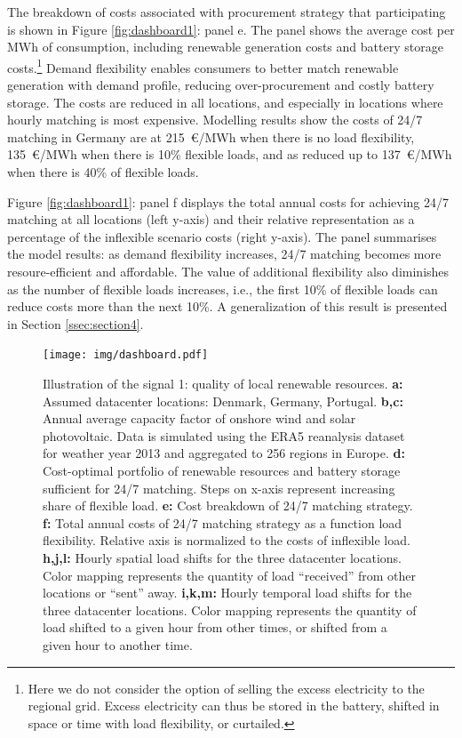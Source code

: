 The breakdown of costs associated with procurement strategy that participating is shown in Figure \ref{fig:dashboard1}: panel e. The panel shows the average cost per MWh of consumption, including renewable generation costs and battery storage costs.\footnote{Here we do not consider the option of selling the excess electricity to the regional grid. Excess electricity can thus be stored in the battery, shifted in space or time with load flexibility, or curtailed.} Demand flexibility enables consumers to better match renewable generation with demand profile, reducing over-procurement and costly battery storage. The costs are reduced in all locations, and especially in locations where hourly matching is most expensive. Modelling results show the costs of 24/7 matching in Germany are at 215~\euro/MWh when there is no load flexibility, 135~\euro/MWh when there is 10\% flexible loads, and as reduced up to 137~\euro/MWh when there is 40\% of flexible loads.

Figure \ref{fig:dashboard1}: panel f displays the total annual costs for achieving 24/7 matching at all locations (left y-axis) and their relative representation as a percentage of the inflexible scenario costs (right y-axis). The panel summarises the model results: as demand flexibility increases, 24/7 matching becomes more resoure-efficient and affordable. The value of additional flexibility also diminishes as the number of flexible loads increases, i.e., the first 10\% of flexible loads can reduce costs more than the next 10\%. A generalization of this result is presented in Section \ref{ssec:section4}.

\begin{figure}
    \centering
    \texttt{[image: img/dashboard.pdf]}
    \caption{Illustration of the signal 1: quality of local renewable resources.
        \textbf{a:} Assumed datacenter locations: Denmark, Germany, Portugal.
        \textbf{b,c:} Annual average capacity factor of onshore wind and solar photovoltaic. Data is simulated using the ERA5 reanalysis dataset for weather year 2013 and aggregated to 256 regions in Europe.
        \textbf{d:} Cost-optimal portfolio of renewable resources and battery storage sufficient for 24/7 matching. Steps on x-axis represent increasing share of flexible load.
        \textbf{e:} Cost breakdown of 24/7 matching strategy.
        \textbf{f:} Total annual costs of 24/7 matching strategy as a function load flexibility. Relative axis is normalized to the costs of inflexible load.
        \textbf{h,j,l:} Hourly spatial load shifts for the three datacenter locations. Color mapping represents the quantity of load \enquote{received} from other locations or \enquote{sent} away.
        \textbf{i,k,m:} Hourly temporal load shifts for the three datacenter locations. Color mapping represents the quantity of load shifted to a given hour from other times, or shifted from a given hour to another time.}
    \label{fig: dashboard1}
\end{figure}


